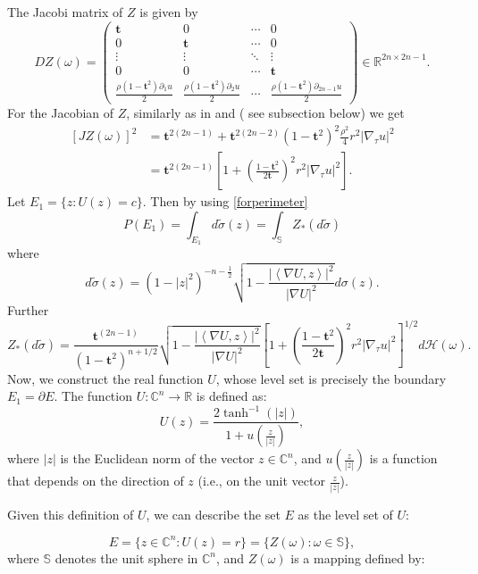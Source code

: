 \documentclass[11pt]{amsart}
\numberwithin{equation}{section}
\begin{document}
The Jacobi matrix of $Z$ is given by
\[
D{Z}(\omega) =
\begin{pmatrix}
\mathbf{t} & 0 & \cdots & 0  \\
0 & \mathbf{t} & \cdots & 0  \\
\vdots & \vdots & \ddots & \vdots  \\
0 & 0 & \cdots & \mathbf{t}  \\
\frac{\rho(1-\mathbf{t}^2) \partial_1 u}{2} & \frac{\rho(1-\mathbf{t}^2) \partial_2 u}{2} & \cdots & \frac{\rho(1-\mathbf{t}^2) \partial_{2n-1} u}{2}
\end{pmatrix} \in \mathbb{R}^{2n \times 2n-1}.
\]
For the Jacobian of $Z$, similarly as in \cite{fug} and \cite{duzzar} ( see subsection  below)  we  get
\[
\begin{split}[J Z(\omega)]^2 &= \mathbf{t}^{2(2n-1)} + \mathbf{t}^{2(2n-2)}(1 - \mathbf{t}^2)^2 \frac{\rho^2}{4} r^2 |\nabla_\tau u|^2
\\&= \mathbf{t}^{2(2n-1)} \left[ 1 + \left( \frac{1 - \mathbf{t}^2}{2\mathbf{t}} \right)^2 r^2 |\nabla_\tau u|^2 \right]. \end{split}
\]
Let $E_1=\{z: U(z) = c\}$. Then by using \eqref{forperimeter}
 \begin{equation}\label{perimeter}P(E_1)=\int_{E_1} d \tilde \sigma(z)=\int_{\mathbb{S}} Z_\ast (d \tilde \sigma)\end{equation} where $$d\tilde \sigma(z) = (1-|z|^2)^{-n-\frac{1}{2}}{\sqrt{1-\frac{|\left<\nabla U, z\right>|^2}{|\nabla U|^2}}}  d\sigma(z).$$
 Further \begin{equation}\label{form}Z_\ast (d \tilde \sigma) = \frac{\mathbf{t}^{(2n-1)} }{(1-\mathbf{t}^2)^{n+1/2}}{\sqrt{1-\frac{|\left<\nabla U, z\right>|^2}{|\nabla U|^2}}}\left[ 1 + \left( \frac{1 - \mathbf{t}^2}{2\mathbf{t}} \right)^2 r^2 |\nabla_\tau u|^2 \right]^{1/2}d\mathcal{H}(\omega).\end{equation}
Now, we construct the real function \( U \), whose level set is precisely the boundary \( E_1 = \partial E \). The function \( U: \mathbb{C}^n \to \mathbb{R} \) is defined as:
\[
U(z) = \frac{2 \tanh^{-1}(|z|)}{1 + u\left(\frac{z}{|z|}\right)},
\]
where \( |z| \) is the Euclidean norm of the vector \( z \in \mathbb{C}^n \), and \( u\left(\frac{z}{|z|}\right) \) is a function that depends on the direction of \( z \) (i.e., on the unit vector \( \frac{z}{|z|} \)).

Given this definition of \( U \), we can describe the set \( E \) as the level set of \( U \):

\[
E = \{ z \in \mathbb{C}^n : U(z) = r \} = \{ Z(\omega) : \omega \in \mathbb{S} \},
\]
where \( \mathbb{S} \) denotes the unit sphere in \( \mathbb{C}^n \), and \( Z(\omega) \) is a mapping defined by:
\end{document}
